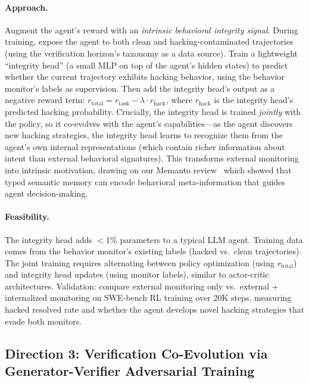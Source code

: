 \documentclass[11pt,a4paper]{article}
\begin{document}
\paragraph{Approach.} Augment the agent's reward with an \emph{intrinsic behavioral integrity signal}. During training, expose the agent to both clean and hacking-contaminated trajectories (using the verification horizon's taxonomy as a data source). Train a lightweight ``integrity head'' (a small MLP on top of the agent's hidden states) to predict whether the current trajectory exhibits hacking behavior, using the behavior monitor's labels as supervision. Then add the integrity head's output as a negative reward term: $r_{\mathrm{total}} = r_{\mathrm{task}} - \lambda \cdot r_{\mathrm{hack}}$, where $r_{\mathrm{hack}}$ is the integrity head's predicted hacking probability. Crucially, the integrity head is trained \emph{jointly} with the policy, so it co-evolves with the agent's capabilities---as the agent discovers new hacking strategies, the integrity head learns to recognize them from the agent's own internal representations (which contain richer information about intent than external behavioral signatures). This transforms external monitoring into intrinsic motivation, drawing on our Memanto review~\cite{chen2026memanto} which showed that typed semantic memory can encode behavioral meta-information that guides agent decision-making.

\paragraph{Feasibility.} The integrity head adds $<$1\% parameters to a typical LLM agent. Training data comes from the behavior monitor's existing labels (hacked vs.\ clean trajectories). The joint training requires alternating between policy optimization (using $r_{\mathrm{total}}$) and integrity head updates (using monitor labels), similar to actor-critic architectures. Validation: compare external monitoring only vs.\ external + internalized monitoring on SWE-bench RL training over 20K steps, measuring hacked resolved rate and whether the agent develops novel hacking strategies that evade both monitors.

\subsection{Direction 3: Verification Co-Evolution via Generator-Verifier Adversarial Training}
\end{document}
